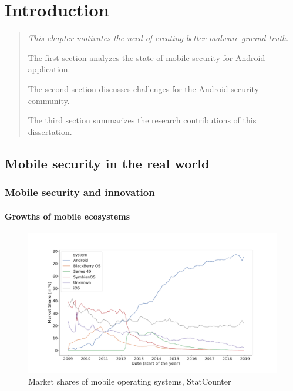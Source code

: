 \chapter{Introduction}
\label{chapter:introduction}

\begin{quote}
{\itshape
This chapter motivates the need of creating better malware ground truth.

The first section analyzes the state of mobile security for Android application.

The second section discusses challenges for the Android security community.

The third section summarizes the research contributions of this dissertation.
}
\end{quote}

\localtableofcontents{}

\section{Mobile security in the real world}
\subsection{Mobile security and innovation}
\subsubsection{Growths of mobile ecosystems}

\begin{figure}[!ht]
        \centering
	\includegraphics[width=\linewidth]{figures/introduction/marketshare.pdf}
        \caption[Market shares of mobile operating systems]{Market shares of mobile operating systems, StatCounter~\cite{statcounter_mobile_2019}}
	\label{figure:introduction:marketshare}
\end{figure}

